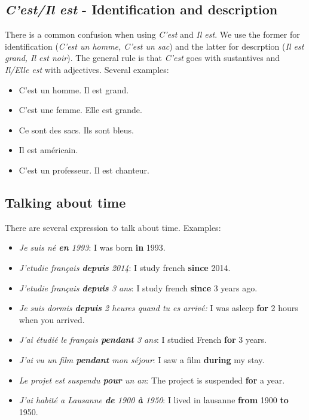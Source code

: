 \documentclass{epflnotes}
\begin{document}
\subsection{\textit{C'est/Il est} - Identification and description}

There is a common confusion when using \textit{C'est} and \textit{Il est}. We use the former for identification (\textit{C'est un homme, C'est un sac}) and the latter for descrption (\textit{Il est grand, Il est noir}). The general rule is that \textit{C'est} goes with sustantives and \textit{Il/Elle est} with adjectives. Several examples:


\begin{itemize}
\item C'est un homme. Il est grand.
\item C'est une femme. Elle est grande.
\item Ce sont des sacs. Ils sont bleus.
\item Il est américain.
\item C'est un professeur. Il est chanteur.
\end{itemize}

\subsection{Talking about time}

There are several expression to talk about time. Examples:

\begin{itemize}
\item \textit{Je suis né \textbf{en} 1993}: I was born \textbf{in} 1993.
\item \textit{J'etudie français \textbf{depuis} 2014}: I study french \textbf{since} 2014.
\item \textit{J'etudie français \textbf{depuis} 3 ans}: I study french \textbf{since} 3 years ago.
\item \textit{Je suis dormis \textbf{depuis} 2 heures quand tu es arrivé:} I was asleep \textbf{for} 2 hours when you arrived.
\item \textit{J'ai étudié le français \textbf{pendant} 3 ans}: I studied French \textbf{for} 3 years.
\item \textit{J'ai vu un film \textbf{pendant} mon séjour}: I saw a film \textbf{during} my stay.
\item \textit{Le projet est suspendu \textbf{pour} un an}: The project is suspended \textbf{for} a year.
\item \textit{J'ai habité a Lausanne \textbf{de} 1900 \textbf{à} 1950}: I lived in lausanne \textbf{from} 1900 \textbf{to} 1950.
\end{itemize}
\end{document}
